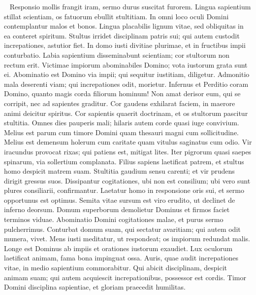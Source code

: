 \begin{biblechapter}   
\verse Responsio mollis frangit iram, sermo durus suscitat furorem. 
\verse Lingua sapientium stillat scientiam, os fatuorum ebullit stultitiam. 
\verse In omni loco oculi Domini contemplantur malos et bonos. 
\verse Lingua placabilis lignum vitae, sed obliquitas in ea conteret spiritum. 
\verse Stultus irridet disciplinam patris sui; qui autem custodit increpationes, astutior fiet. 
\verse In domo iusti divitiae plurimae, et in fructibus impii conturbatio. 
\verse Labia sapientium disseminabunt scientiam; cor stultorum non rectum erit. 
\verse Victimae impiorum abominabiles Domino; vota iustorum grata sunt ei. 
\verse Abominatio est Domino via impii; qui sequitur iustitiam, diligetur. 
\verse Admonitio mala deserenti viam; qui increpationes odit, morietur. 
\verse Infernus et Perditio coram Domino, quanto magis corda filiorum hominum! 
\verse Non amat derisor eum, qui se corripit, nec ad sapientes graditur. 
\verse Cor gaudens exhilarat faciem, in maerore animi deicitur spiritus. 
\verse Cor sapientis quaerit doctrinam, et os stultorum pascitur stultitia. 
\verse Omnes dies pauperis mali; hilaris autem corde quasi iuge convivium. 
\verse Melius est parum cum timore Domini quam thesauri magni cum sollicitudine. 
\verse Melius est demensum holerum cum caritate quam vitulus saginatus cum odio. 
\verse Vir iracundus provocat rixas; qui patiens est, mitigat lites. 
\verse Iter pigrorum quasi saepes spinarum, via sollertium complanata. 
\verse Filius sapiens laetificat patrem, et stultus homo despicit matrem suam. 
\verse Stultitia gaudium sensu carenti; et vir prudens dirigit gressus suos. 
\verse Dissipantur cogitationes, ubi non est consilium; ubi vero sunt plures consiliarii, confirmantur. 
\verse Laetatur homo in responsione oris sui, et sermo opportunus est optimus. 
\verse Semita vitae sursum est viro erudito, ut declinet de inferno deorsum. 
\verse Domum superborum demolietur Dominus et firmos faciet terminos viduae. 
\verse Abominatio Domini cogitationes malae, et purus sermo pulcherrimus. 
\verse Conturbat domum suam, qui sectatur avaritiam; qui autem odit munera, vivet. 
\verse Mens iusti meditatur, ut respondeat; os impiorum redundat malis. 
\verse Longe est Dominus ab impiis et orationes iustorum exaudiet. 
\verse Lux oculorum laetificat animam, fama bona impinguat ossa. 
\verse Auris, quae audit increpationes vitae, in medio sapientium commorabitur. 
\verse Qui abicit disciplinam, despicit animam suam; qui autem acquiescit increpationibus, possessor est cordis. 
\verse Timor Domini disciplina sapientiae, et gloriam praecedit humilitas. 
\end{biblechapter}

